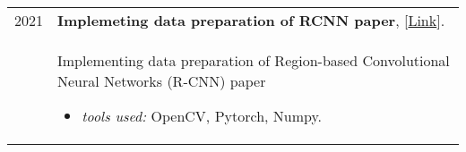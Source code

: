 \documentclass[a4paper,10pt]{article}
\begin{document}
\begin{longtable}{r p{16cm}}
        2021  & \textbf{Implemeting data preparation of RCNN paper}, [\href{https://github.com/zaky-fetoh/Implemeting_data_preparation_of_RCNN_paper}{Link}].\\&
        Implementing data preparation of Region-based Convolutional Neural Networks (R-CNN) paper
        \begin{itemize}
            \item \textit{tools used: } OpenCV, Pytorch, Numpy.
        \end{itemize}\\
    
    \end{longtable}

\label{LastPage}
\end{document}
